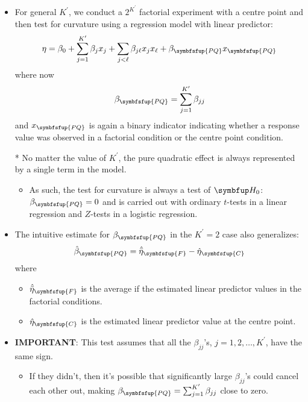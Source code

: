 \begin{itemize}
      \item For general $ K^\prime $, we conduct a $ 2^{K^\prime} $ factorial experiment with a centre point and then test for curvature
            using a regression model with linear predictor:
            \[ \eta=\beta_0+\sum_{j=1}^{K^\prime} \beta_j x_j+\sum_{j<\ell}\beta_{j\ell}x_j x_\ell+\beta_{\symbfsfup{PQ}}x_{\symbfsfup{PQ}} \]
            where now
            \[ \beta_{\symbfsfup{PQ}}=\sum_{j=1}^{K^\prime} \beta_{jj} \]
            and $ x_{\symbfsfup{PQ}} $ is again a binary indicator indicating whether a response value was observed in a factorial
            condition or the centre point condition.
      \item[*] No matter the value of $ K^\prime $, the pure quadratic effect is always represented by a single term in the model.
            \begin{itemize}
                  \item As such, the test for curvature is always a test of $ \HN $: $ \beta_{\symbfsfup{PQ}}=0 $ and is carried out with ordinary
                        $t$-tests in a linear regression and $Z$-tests in a logistic regression.
            \end{itemize}
      \item The intuitive estimate for $ \beta_{\symbfsfup{PQ}} $ in the $ K^\prime=2 $ case also generalizes:
            \[ \hat{\beta}_{\symbfsfup{PQ}}=\hat{\bar{\eta}}_{\symbfsfup{F}}-\hat{\eta}_{\symbfsfup{C}} \]
            where
            \begin{itemize}[$\rightarrow$]
                  \item $ \hat{\bar{\eta}}_{\symbfsfup{F}} $ is the average if the estimated linear predictor values in the factorial conditions.
                  \item $ \hat{\eta}_{\symbfsfup{C}} $ is the estimated linear predictor value at the centre point.
            \end{itemize}
      \item \textbf{IMPORTANT}: This test assumes that all the $ \beta_{jj} $'s, $ j=1,2,\ldots,K^\prime $, have the same sign.
            \begin{itemize}
                  \item If they didn't, then it's possible that significantly large $ \beta_{jj} $'s could cancel each other out, making
                        $ \beta_{\symbfsfup{PQ}}=\sum_{j=1}^{K^\prime} \beta_{jj} $ close to zero.
                        \begin{itemize}[$\hookrightarrow$]

\end{itemize}
\end{itemize}
\end{itemize}
